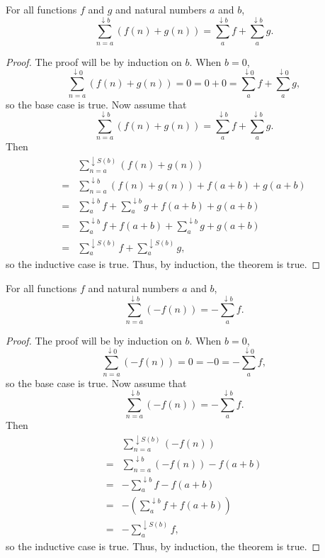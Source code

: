 \documentclass[../math.tex]{subfiles}
\begin{document}
\begin{theorem}
    For all functions $f$ and $g$ and natural numbers $a$ and $b$,
    \[
        \sum_{n = a}^{\downarrow b} (f(n) + g(n)) =
        \sum_a^{\downarrow b} f + \sum_a^{\downarrow b} g.
    \]
\end{theorem}
\begin{proof}
    The proof will be by induction on $b$.  When $b = 0$,
    \[
        \sum_{n = a}^{\downarrow 0} (f(n) + g(n)) =
        0 = 0 + 0 =
        \sum_a^{\downarrow 0} f + \sum_a^{\downarrow 0} g,
    \]
    so the base case is true.  Now assume that
    \[
        \sum_{n = a}^{\downarrow b} (f(n) + g(n)) =
        \sum_a^{\downarrow b} f + \sum_a^{\downarrow b} g.
    \]
    Then
    \begin{align*}
           & \sum_{n = a}^{\downarrow S(b)} (f(n) + g(n)) \\
        ={}& \sum_{n = a}^{\downarrow b} (f(n) + g(n)) + f(a + b) + g(a + b) \\
        ={}& \sum_a^{\downarrow b} f + \sum_a^{\downarrow b} g
            + f(a + b) + g(a + b) \\
        ={}& \sum_a^{\downarrow b} f + f(a + b) +
             \sum_a^{\downarrow b} g + g(a + b) \\
        ={}& \sum_a^{\downarrow S(b)} f + \sum_a^{\downarrow S(b)} g,
    \end{align*}
    so the inductive case is true.  Thus, by induction, the theorem is true.
\end{proof}

\begin{theorem}
    For all functions $f$ and natural numbers $a$ and $b$,
    \[
        \sum_{n = a}^{\downarrow b} (-f(n)) = -\sum_a^{\downarrow b} f.
    \]
\end{theorem}
\begin{proof}
    The proof will be by induction on $b$.  When $b = 0$,
    \[
        \sum_{n = a}^{\downarrow 0} (-f(n)) =
        0 = -0 =
        -\sum_a^{\downarrow 0} f,
    \]
    so the base case is true.  Now assume that
    \[
        \sum_{n = a}^{\downarrow b} (-f(n)) = -\sum_a^{\downarrow b} f.
    \]
    Then
    \begin{align*}
           & \sum_{n = a}^{\downarrow S(b)} (-f(n)) \\
        ={}& \sum_{n = a}^{\downarrow b} (-f(n)) - f(a + b) \\
        ={}& -\sum_a^{\downarrow b} f - f(a + b) \\
        ={}& -\left( \sum_a^{\downarrow b} f + f(a + b) \right) \\
        ={}& -\sum_a^{\downarrow S(b)} f,
    \end{align*}
    so the inductive case is true.  Thus, by induction, the theorem is true.
\end{proof}
\end{document}
